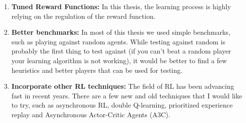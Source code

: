 \begin{enumerate}

    \item \textbf{Tuned Reward Functions:} In this thesis, the learning process is highly relying on the regulation of the reward function.
    
    \item \textbf{Better benchmarks:} In most of this thesis we used simple benchmarks, such as playing against random agents. While testing against random is probably the first thing to test against (if you can't beat a random player your learning algorithm is not working), it would be better to find a few heuristics and better players that can be used for testing.

    \item \textbf{Incorporate other RL techniques:} The field of RL has been advancing fast in recent years. There are a few new and old techniques that I would like to try, such as asynchronous RL, double Q-learning, prioritized experience replay and Asynchronous Actor-Critic Agents (A3C).

\end{enumerate}
